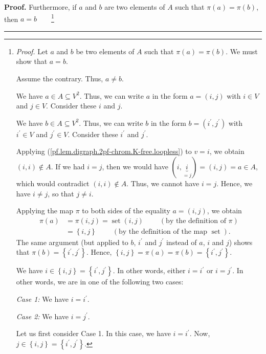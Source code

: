 \documentclass[numbers=enddot,12pt,final,onecolumn,notitlepage]{scrartcl}%
\theoremstyle{definition}
\newenvironment{proof}[1][Proof]{\noindent\textbf{#1.} }{\ \rule{0.5em}{0.5em}}
\newenvironment{verlong}{}{}
\begin{document}
\begin{verlong}
\begin{proof}
Furthermore, if $a$ and $b$ are two elements of $A$ such that $\pi\left(
a\right)  =\pi\left(  b\right)  $, then $a=b$\ \ \ \ \footnote{\textit{Proof.}
Let $a$ and $b$ be two elements of $A$ such that $\pi\left(  a\right)
=\pi\left(  b\right)  $. We must show that $a=b$.
\par
Assume the contrary. Thus, $a\neq b$.
\par
We have $a\in A\subseteq V^{2}$. Thus, we can write $a$ in the form $a=\left(
i,j\right)  $ with $i\in V$ and $j\in V$. Consider these $i$ and $j$.
\par
We have $b\in A\subseteq V^{2}$. Thus, we can write $b$ in the form $b=\left(
i^{\prime},j^{\prime}\right)  $ with $i^{\prime}\in V$ and $j^{\prime}\in V$.
Consider these $i^{\prime}$ and $j^{\prime}$.
\par
Applying (\ref{pf.lem.digraph.2pf-chrom.K-free.loopless}) to $v=i$, we obtain
$\left(  i,i\right)  \notin A$. If we had $i=j$, then we would have $\left(
i,\underbrace{i}_{=j}\right)  =\left(  i,j\right)  =a\in A$, which would
contradict $\left(  i,i\right)  \notin A$. Thus, we cannot have $i=j$. Hence,
we have $i\neq j$, so that $j\neq i$.
\par
Applying the map $\pi$ to both sides of the equality $a=\left(  i,j\right)  $,
we obtain
\begin{align*}
\pi\left(  a\right)   &  =\pi\left(  i,j\right)  =\operatorname*{set}\left(
i,j\right)  \ \ \ \ \ \ \ \ \ \ \left(  \text{by the definition of }\pi\right)
\\
&  =\left\{  i,j\right\}  \ \ \ \ \ \ \ \ \ \ \left(  \text{by the definition
of the map }\operatorname*{set}\right)  .
\end{align*}
The same argument (but applied to $b$, $i^{\prime}$ and $j^{\prime}$ instead
of $a$, $i$ and $j$) shows that $\pi\left(  b\right)  =\left\{  i^{\prime
},j^{\prime}\right\}  $. Hence, $\left\{  i,j\right\}  =\pi\left(  a\right)
=\pi\left(  b\right)  =\left\{  i^{\prime},j^{\prime}\right\}  $.
\par
We have $i\in\left\{  i,j\right\}  =\left\{  i^{\prime},j^{\prime}\right\}  $.
In other words, either $i=i^{\prime}$ or $i=j^{\prime}$. In other words, we
are in one of the following two cases:
\par
\textit{Case 1:} We have $i=i^{\prime}$.
\par
\textit{Case 2:} We have $i=j^{\prime}$.
\par
Let us first consider Case 1. In this case, we have $i=i^{\prime}$. Now,
$j\in\left\{  i,j\right\}  =\left\{  i^{\prime},j^{\prime}\right\}  $.
}
\end{proof}
\end{verlong}
\end{document}
